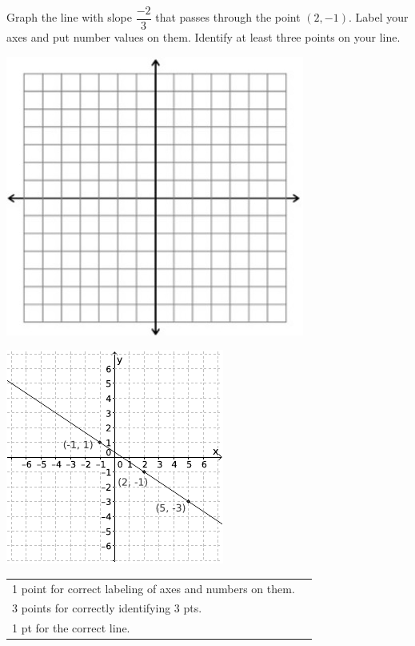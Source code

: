 {
	Graph the line with slope $\dfrac{-2}{3}$ that passes through the point $(2, -1)$. Label your axes and put number values on them. Identify at least three points on your line.\begin{onlyproblem}\begin{center}\includegraphics{fig-graphpaper.png}\end{center}\end{onlyproblem} \begin{onlysolution}\begin{center}\includegraphics{fig095-08-b-answer}\end{center}\end{onlysolution}
}
{
	\begin{tabular}{l r}
	1 point for correct labeling of axes and numbers on them.\\
	3 points for correctly identifying 3 pts.\\
	1 pt for the correct line.\\
	\end{tabular}
}

